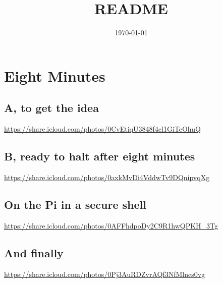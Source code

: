 \documentclass[11pt]{article}
\title{README}
\author{}
\date{\today}
\begin{document}
\maketitle

\setcounter{tocdepth}{3}
\tableofcontents
\vspace*{1cm}
\section{Eight Minutes}
\label{sec-1}
\subsection{A, to get the idea}
\label{sec-1-1}

\href{https://share.icloud.com/photos/0CvEtiqU3848f4cl1GiTeOhuQ}{https://share.icloud.com/photos/0CvEtiqU3848f4cl1GiTeOhuQ}
\subsection{B, ready to halt after eight minutes}
\label{sec-1-2}

\href{https://share.icloud.com/photos/0axkMvDi4VddwTv9DQnipvqXg}{https://share.icloud.com/photos/0axkMvDi4VddwTv9DQnipvqXg}
\subsection{On the Pi in a secure shell}
\label{sec-1-3}

\href{https://share.icloud.com/photos/0AFFhdpoDy2C9R1hwQPKH_3Tg}{https://share.icloud.com/photos/0AFFhdpoDy2C9R1hwQPKH\_3Tg}
\subsection{And finally}
\label{sec-1-4}

\href{https://share.icloud.com/photos/0Pj3AuRDZvrAQf3NfMlnes0vg}{https://share.icloud.com/photos/0Pj3AuRDZvrAQf3NfMlnes0vg}
\end{document}
